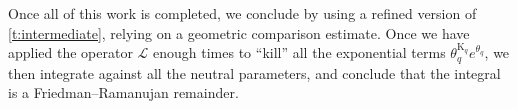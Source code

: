 \documentclass[12pt,twoside]{article}
\theoremstyle{theorem}
\theoremstyle{remark}
\theoremstyle{definition}
\theoremstyle{example}
\newcommand{\1}[1]{\mathds{1}_{#1}}
\newcommand{\cL}{\mathcal{L}}
\newcommand{\rK}{\mathrm{K}}
\begin{document}
Once all of this work is completed, we conclude by using a refined version of
\cref{t:intermediate}, relying on a geometric comparison estimate. Once we have applied the
operator $\cL$ enough times to ``kill'' all the exponential terms $\theta_q^{\rK_q}e^{\theta_q}$, we
then integrate against all the neutral parameters, and conclude that the integral is a
Friedman--Ramanujan remainder. 








\end{document}
